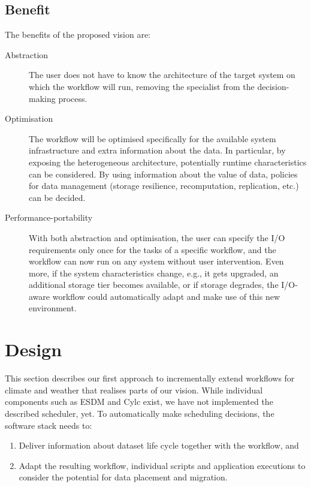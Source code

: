 \documentclass{superfri}
\begin{document}
\subsection{Benefit}

The benefits of the proposed vision are:

\begin{description}

\item[Abstraction] The user does not have to know the architecture of the target system on which the workflow will run, removing the specialist from the decision-making process.

\item[Optimisation] The workflow will be optimised specifically for the available system infrastructure and extra information about the data.
In particular, by exposing the heterogeneous architecture, potentially runtime characteristics can be considered.
By using information about the value of data, policies for data management (storage resilience,  recomputation, replication, etc.) can be decided.

\item[Performance-portability] With both abstraction and optimisation, the user can specify the I/O requirements only once for the tasks of a specific workflow, and the workflow can now run on any system without user intervention.
Even more, if the system characteristics change, e.g., it gets upgraded, an additional storage tier becomes available, or if storage degrades, the I/O-aware workflow could automatically adapt and make use of this new environment. %

\end{description}

\section{Design}
\label{sec:design}

This section describes our first approach to incrementally extend workflows for climate and weather that realises parts of our vision.
While individual components such as ESDM and Cylc exist, we have not implemented the described scheduler, yet.
To automatically make scheduling decisions, the software stack needs to:

\begin{enumerate}

\item Deliver information about dataset life cycle together with the workflow, and

\item Adapt the resulting workflow, individual scripts and application executions to consider the potential for data placement and migration.

\end{enumerate}
\end{document}
